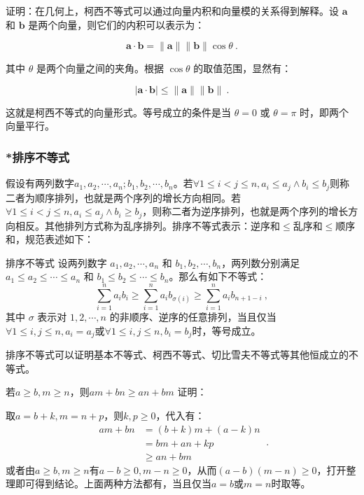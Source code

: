 证明：在几何上，柯西不等式可以通过向量内积和向量模的关系得到解释。设 $\mathbf{a}$ 和 $\mathbf{b}$ 是两个向量，则它们的内积可以表示为：

$$\mathbf{a} \cdot \mathbf{b} = \|\mathbf{a}\| \|\mathbf{b}\| \cos \theta~.$$

其中 $\theta$ 是两个向量之间的夹角。根据 $\cos \theta$ 的取值范围，显然有：

$$|\mathbf{a} \cdot \mathbf{b}| \leq \|\mathbf{a}\| \|\mathbf{b}\|~.$$

这就是柯西不等式的向量形式。等号成立的条件是当 $\theta = 0$ 或 $\theta = \pi$ 时，即两个向量平行。

\subsubsection{*排序不等式}

假设有两列数字$a_1,a_2,\cdots,a_n;b_1,b_2,\cdots,b_n$。若$\forall 1\leq i<j\leq n,a_i\leq a_j\land b_i\leq b_j$则称二者为顺序排列，也就是两个序列的增长方向相同。若$\forall 1\leq i<j\leq n,a_i\leq a_j\land b_i\geq b_j$，则称二者为逆序排列，也就是两个序列的增长方向相反。其他排列方式称为乱序排列。排序不等式表示：逆序和$\leq$乱序和$\leq$顺序和，规范表述如下：

\begin{theorem}{排序不等式}
设两列数字 $a_1, a_2, \cdots, a_n$ 和 $b_1, b_2, \cdots, b_n$，两列数分别满足 $a_1 \leq a_2 \leq \cdots \leq a_n$ 和 $b_1 \leq b_2 \leq \cdots \leq b_n$。那么有如下不等式：
\begin{equation}
\sum_{i=1}^n a_i b_i \geq \sum_{i=1}^n a_i b_{\sigma(i)} \geq \sum_{i=1}^n a_i b_{n+1-i}~,
\end{equation}
其中 $\sigma$ 表示对 ${1, 2, \cdots, n}$ 的非顺序、逆序的任意排列，当且仅当$\forall 1\leq i,j\leq n,a_i=a_j$或$\forall 1\leq i,j\leq n,b_i=b_j$时，等号成立。
\end{theorem}

排序不等式可以证明基本不等式、柯西不等式、切比雪夫不等式等其他恒成立的不等式。

\begin{lemma}{若$a\geq b,m\geq n$，则$am+bn\geq an+bm$}\label{lem_HsEquN_1}
证明：

取$a=b+k,m=n+p$，则$k,p\geq0$，代入有：
\begin{equation}
\begin{split}
am+bn&= (b+k)m+(a-k)n \\ 
&= bm+an+kp \\
&\geq an+bm
\end{split}~.
\end{equation}
或者由$a\geq b,m\geq n$有$a-b\geq 0,m- n\geq0$，从而$(a-b)(m- n)\geq0$，打开整理即可得到结论。上面两种方法都有，当且仅当$a=b$或$m=n$时取等。
\end{lemma}

